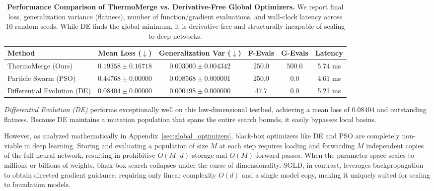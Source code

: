 \begin{table}[t]
\caption{\textbf{Performance Comparison of ThermoMerge vs. Derivative-Free Global Optimizers.} We report final loss, generalization variance (flatness), number of function/gradient evaluations, and wall-clock latency across 10 random seeds. While DE finds the global minimum, it is derivative-free and structurally incapable of scaling to deep networks.}
\label{tab:global_opts}
\vskip 0.15in
\begin{center}
\begin{small}
\begin{sc}
\begin{tabular}{lccccc}
\toprule
Method & Mean Loss ($\downarrow$) & Generalization Var ($\downarrow$) & F-Evals & G-Evals & Latency \\
\midrule
ThermoMerge (Ours) & $0.19358 \pm 0.16718$ & $0.003000 \pm 0.004342$ & 250.0 & 500.0 & 5.74 ms \\
Particle Swarm (PSO) & $0.44768 \pm 0.00000$ & $0.008568 \pm 0.000001$ & 250.0 & 0.0 & 4.61 ms \\
Differential Evolution (DE) & $\mathbf{0.08404 \pm 0.00000}$ & $\mathbf{0.000198 \pm 0.000000}$ & 47.7 & 0.0 & 5.21 ms \\
\bottomrule
\end{tabular}
\end{sc}
\end{small}
\end{center}
\vskip -0.1in
\end{table}

\emph{Differential Evolution (DE)} performs exceptionally well on this low-dimensional testbed, achieving a mean loss of $0.08404$ and outstanding flatness.
Because DE maintains a mutation population that spans the entire search bounds, it easily bypasses local basins.

However, as analyzed mathematically in Appendix~\ref{sec:global_optimizers}, black-box optimizers like DE and PSO are completely non-viable in deep learning.
Storing and evaluating a population of size $M$ at each step requires loading and forwarding $M$ independent copies of the full neural network, resulting in prohibitive $O(M \cdot d)$ storage and $O(M)$ forward passes.
When the parameter space scales to millions or billions of weights, black-box search collapses under the curse of dimensionality.
SGLD, in contrast, leverages backpropagation to obtain directed gradient guidance, requiring only linear complexity $O(d)$ and a single model copy, making it uniquely suited for scaling to foundation models.

